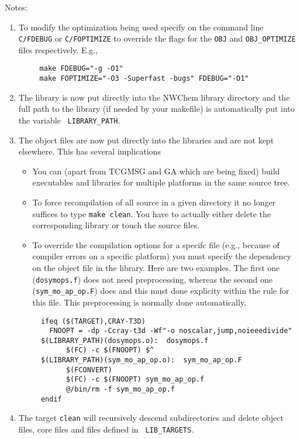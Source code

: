Notes:
\begin{enumerate}
\item  To modify the optimization being used specify on the command
  line {\tt C/FDEBUG} or {\tt C/FOPTIMIZE} to override the flags for the 
  {\tt OBJ} and {\tt OBJ\_OPTIMIZE} files respectively.  E.g.,
\begin{verbatim}
     make FDEBUG="-g -O1"
     make FOPTIMIZE="-O3 -Superfast -bugs" FDEBUG="-O1"
\end{verbatim}
\item  The library is now put directly into the NWChem library
  directory and the full path to the library (if needed by your
  makefile) is automatically put into the variable {\tt
    LIBRARY\_PATH}.
\item The object files are now put directly into the libraries and are
  not kept elsewhere.  This has several implications
  \begin{itemize}
  \item You can (apart from TCGMSG and GA which are being fixed) build
    executables and libraries for multiple platforms in the same
    source tree.
  \item To force recompilation of all source in a given directory it
    no longer suffices to type \verb+make clean+.  You have to
    actually either delete the corresponding library or touch the
    source files.
  \item To override the compilation options for a specifc file (e.g.,
    because of compiler errors on a specific platform) you must
    specify the dependency on the object file in the library.  Here
    are two examples.  The first one (\verb+dosymops.f+) does not need
    preprocessing, whereas the second one (\verb+sym_mo_ap_op.F+) does
    and this must done explicity within the rule for this file.
    This preprocessing is normally done automatically.
\begin{verbatim}
  ifeq ($(TARGET),CRAY-T3D)
    FNOOPT = -dp -Ccray-t3d -Wf"-o noscalar,jump,noieeedivide"
  $(LIBRARY_PATH)(dosymops.o):  dosymops.f
        $(FC) -c $(FNOOPT) $^
  $(LIBRARY_PATH)(sym_mo_ap_op.o):  sym_mo_ap_op.F
        $(FCONVERT)
        $(FC) -c $(FNOOPT) sym_mo_ap_op.f
        @/bin/rm -f sym_mo_ap_op.f
  endif
\end{verbatim}
  \end{itemize}
\item The target {\tt clean} will recursively descend subdirectories and
  delete object files, core files and files defined in {\tt
    LIB\_TARGETS}.

\end{enumerate}
